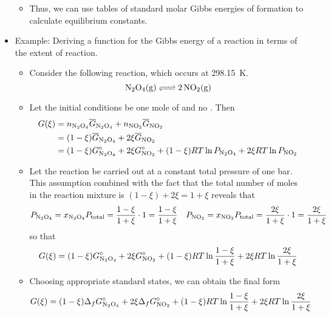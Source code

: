 \documentclass[../notes.tex]{subfiles}
\begin{document}
\begin{itemize}
\begin{itemize}
        \item Thus, we can use tables of standard molar Gibbs energies of formation to calculate equilibrium constants.
    \end{itemize}
    \item Example: Deriving a function for the Gibbs energy of a reaction in terms of the extent of reaction.
    \begin{itemize}
        \item Consider the following reaction, which occurs at \SI{298.15}{\kelvin}.
        \begin{equation*}
            \ce{N2O4(g) <=> 2NO2(g)}
        \end{equation*}
        \item Let the initial conditions be one mole of  and no . Then
        \begin{align*}
            G(\xi) &= n_{\ce{N2O4}}\overline{G}_{\ce{N2O4}}+n_{\ce{NO2}}\overline{G}_{\ce{NO2}}\\
            &= (1-\xi)\overline{G}_{\ce{N2O4}}+2\xi\overline{G}_{\ce{NO2}}\\
            &= (1-\xi)G_{\ce{N2O4}}^\circ+2\xi G_{\ce{NO2}}^\circ+(1-\xi)RT\ln P_{\ce{N2O4}}+2\xi RT\ln P_{\ce{NO2}}
        \end{align*}
        \item Let the reaction be carried out at a constant total pressure of one bar. This assumption combined with the fact that the total number of moles in the reaction mixture is $(1-\xi)+2\xi=1+\xi$ reveals that
        \begin{align*}
            P_{\ce{N2O4}} &= x_{\ce{N2O4}}P_\text{total}
                = \frac{1-\xi}{1+\xi}\cdot 1
                = \frac{1-\xi}{1+\xi}&
            P_{\ce{NO2}} &= x_{\ce{NO2}}P_\text{total}
                = \frac{2\xi}{1+\xi}\cdot 1
                = \frac{2\xi}{1+\xi}
        \end{align*}
        so that
        \begin{equation*}
            G(\xi) = (1-\xi)G_{\ce{N2O4}}^\circ+2\xi G_{\ce{NO2}}^\circ+(1-\xi)RT\ln\frac{1-\xi}{1+\xi}+2\xi RT\ln\frac{2\xi}{1+\xi}
        \end{equation*}
        \item Choosing appropriate standard states, we can obtain the final form
        \begin{equation*}
            G(\xi) = (1-\xi)\Delta_fG_{\ce{N2O4}}^\circ+2\xi\Delta_fG_{\ce{NO2}}^\circ+(1-\xi)RT\ln\frac{1-\xi}{1+\xi}+2\xi RT\ln\frac{2\xi}{1+\xi}

\end{equation*}
\end{itemize}
\end{itemize}
\end{document}
